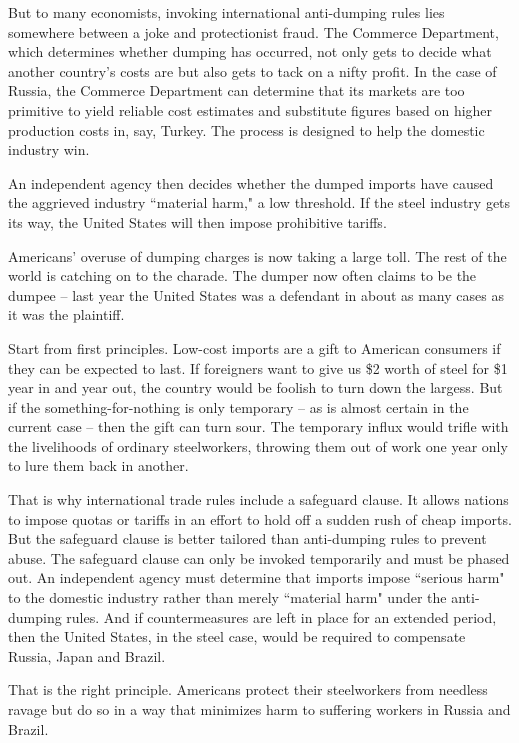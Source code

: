 \documentclass[letterpaper,12pt]{article}
\begin{document}
But to many economists, invoking international anti-dumping rules lies somewhere between a joke and protectionist fraud. The Commerce Department, which determines whether dumping has occurred, not only gets to decide what another country's costs are but also gets to tack on a nifty profit. In the case of Russia, the Commerce Department can determine that its markets are too primitive to yield reliable cost estimates and substitute figures based on higher production costs in, say, Turkey. The process is designed to help the domestic industry win.

An independent agency then decides whether the dumped imports have caused the aggrieved industry ``material harm," a low threshold. If the steel industry gets its way, the United States will then impose prohibitive tariffs.

Americans' overuse of dumping charges is now taking a large toll. The rest of the world is catching on to the charade. The dumper now often claims to be the dumpee -- last year the United States was a defendant in about as many cases as it was the plaintiff.

Start from first principles. Low-cost imports are a gift to American consumers if they can be expected to last. If foreigners want to give us \$2 worth of steel for \$1 year in and year out, the country would be foolish to turn down the largess. But if the something-for-nothing is only temporary -- as is almost certain in the current case -- then the gift can turn sour. The temporary influx would trifle with the livelihoods of ordinary steelworkers, throwing them out of work one year only to lure them back in another.

That is why international trade rules include a safeguard clause. It allows nations to impose quotas or tariffs in an effort to hold off a sudden rush of cheap imports. But the safeguard clause is better tailored than anti-dumping rules to prevent abuse. The safeguard clause can only be invoked temporarily and must be phased out. An independent agency must determine that imports impose ``serious harm" to the domestic industry rather than merely ``material harm" under the anti-dumping rules. And if countermeasures are left in place for an extended period, then the United States, in the steel case, would be required to compensate Russia, Japan and Brazil.

That is the right principle. Americans protect their steelworkers from needless ravage but do so in a way that minimizes harm to suffering workers in Russia and Brazil.
\end{document}
